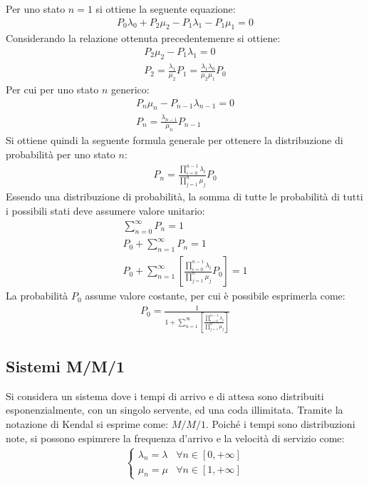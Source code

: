 \documentclass{article}
\numberwithin{equation}{subsection}
\begin{document}
Per uno stato $n=1$ si ottiene la seguente equazione:
\begin{gather*}
    P_0\lambda_0+P_2\mu_2-P_1\lambda_1-P_1\mu_1=0
\end{gather*}
Considerando la relazione ottenuta precedentemenre si ottiene:
\begin{gather*}
    P_2\mu_2-P_1\lambda_1=0\\
    P_2=\displaystyle\frac{\lambda_1}{\mu_2}P_1=\frac{\lambda_1\lambda_0}{\mu_2\mu_1}P_0
\end{gather*}
Per cui per uno stato $n$ generico:
\begin{gather*}
    P_n\mu_n-P_{n-1}\lambda_{n-1}=0\\
    P_n=\displaystyle\frac{\lambda_{n-1}}{\mu_{n}}P_{n-1}
\end{gather*}
Si ottiene quindi la seguente formula generale per ottenere la distribuzione di probabilità per uno stato $n$:
\begin{gather}
    P_n=\displaystyle\frac{\displaystyle\prod_{i=0}^{n-1}\lambda_i}{\displaystyle\prod_{j=1}^n\mu_j}P_0
\end{gather}
Essendo una distribuzione di probabilità, la somma di tutte le probabilità di tutti i possibili stati deve assumere valore unitario:
\begin{gather*}
    \displaystyle\sum_{n=0}^{\infty}P_n=1\\
    P_0+\displaystyle\sum_{n=1}^{\infty}P_n=1\\
    P_0+\displaystyle\sum_{n=1}^{\infty}\left[\frac{\displaystyle\prod_{i=0}^{n-1}\lambda_i}{\displaystyle\prod_{j=1}^n\mu_j}P_0\right]=1
\end{gather*}
La probabilità $P_0$ assume valore costante, per cui è possibile esprimerla come:
\begin{gather}
    P_0=\displaystyle\frac{1}{1+\displaystyle\sum_{n=1}^{\infty}\left[\frac{\displaystyle\prod_{i=0}^{n-1}\lambda_i}{\displaystyle\prod_{j=1}^n\mu_j}\right]}
\end{gather}

\subsection{Sistemi M/M/1}

Si considera un sistema dove i tempi di arrivo e di attesa sono distribuiti esponenzialmente, con un singolo servente, ed una coda illimitata. Tramite la notazione di Kendal 
si esprime come: $M/M/1$. Poiché i tempi sono distribuzioni note, si possono espimrere la frequenza d'arrivo e la velocità di servizio come:
\begin{gather*}
    \begin{cases}
        \lambda_n=\lambda &\forall n\in[0,+\infty]\\
        \mu_n=\mu&\forall n\in[1,+\infty]        
    \end{cases}
\end{gather*}
\end{document}
